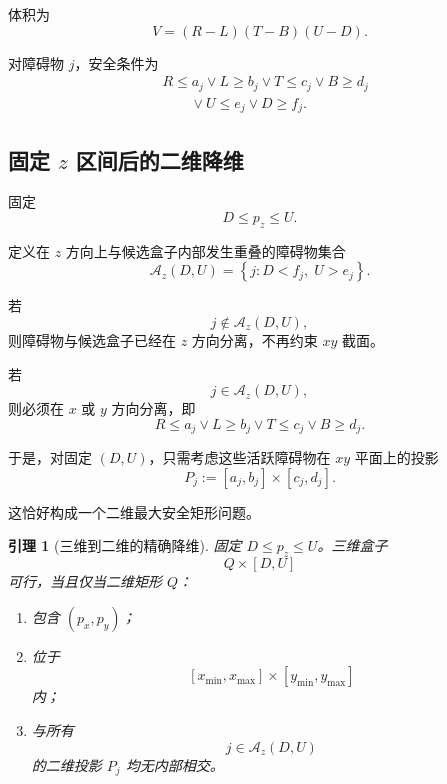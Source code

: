 \documentclass[UTF8,12pt,a4paper]{ctexart}
\newtheorem{lemma}{引理}
\begin{document}
体积为
\begin{equation}
    V=(R-L)(T-B)(U-D).
\end{equation}

对障碍物 $j$，安全条件为
\begin{equation}
\begin{aligned}
    &
    R\le a_j
    \lor
    L\ge b_j
    \lor
    T\le c_j
    \lor
    B\ge d_j
    \\
    &\qquad
    \lor
    U\le e_j
    \lor
    D\ge f_j.
\end{aligned}
\end{equation}

\subsection{固定 \texorpdfstring{$z$}{z} 区间后的二维降维}

固定
\[
D\le p_z\le U.
\]

定义在 $z$ 方向上与候选盒子内部发生重叠的障碍物集合
\begin{equation}
\boxed{
\mathcal A_z(D,U)
=
\left\{
j:
D<f_j,\;
U>e_j
\right\}.
}
\end{equation}

若
\[
j\notin\mathcal A_z(D,U),
\]
则障碍物与候选盒子已经在 $z$ 方向分离，不再约束 $xy$ 截面。

若
\[
j\in\mathcal A_z(D,U),
\]
则必须在 $x$ 或 $y$ 方向分离，即
\begin{equation}
    R\le a_j
    \lor
    L\ge b_j
    \lor
    T\le c_j
    \lor
    B\ge d_j.
\end{equation}

于是，对固定 $(D,U)$，只需考虑这些活跃障碍物在 $xy$ 平面上的投影
\begin{equation}
    P_j
    :=
    [a_j,b_j]\times[c_j,d_j].
\end{equation}

这恰好构成一个二维最大安全矩形问题。

\begin{lemma}[三维到二维的精确降维]
固定 $D\le p_z\le U$。三维盒子
\[
Q\times[D,U]
\]
可行，当且仅当二维矩形 $Q$：
\begin{enumerate}[label=(\arabic*)]
    \item 包含 $(p_x,p_y)$；
    \item 位于
    \[
    [x_{\min},x_{\max}]
    \times
    [y_{\min},y_{\max}]
    \]
    内；
    \item 与所有
    \[
    j\in\mathcal A_z(D,U)
    \]
    的二维投影 $P_j$ 均无内部相交。
\end{enumerate}
\end{lemma}
\end{document}
